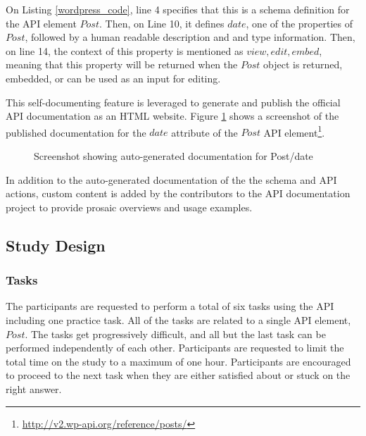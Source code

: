 \documentclass[conference]{IEEEtran}
\begin{document}
On Listing \ref{wordpress_code}, line 4 specifies that this is a schema definition for the API element $Post$. Then, on Line 10, it defines $date$, one of the properties of $Post$, followed by a human readable description and and type information. Then, on line 14, the context of this property is mentioned as $view, edit, embed$, meaning that this property will be returned when the $Post$ object is returned, embedded, or can be used as an input for editing.

This self-documenting feature is leveraged to generate and publish the official API documentation as an HTML website. Figure \ref{fig:schema} shows a screenshot of the published documentation for the $date$ attribute of the $Post$ API element\footnote{\url{http://v2.wp-api.org/reference/posts/}}.

\begin{figure}[h!]
\begin{center}
\end{center}
\caption{Screenshot showing auto-generated documentation for Post/date}
\label{fig:schema}
\end{figure}

In addition to the auto-generated documentation of the the schema and API actions, custom content is added by the contributors to the API documentation project to provide prosaic overviews and usage examples.



\subsection{Study Design} %
\subsubsection{Tasks} %

The participants are requested to perform a total of six tasks using the API including one practice task. All of the tasks are related to a single API element, $Post$. The tasks get progressively difficult, and all but the last task can be performed independently of each other. Participants are requested to limit the total time on the study to a maximum of one hour. Participants are encouraged to proceed to the next task when they are either satisfied about or stuck on the right answer.
\end{document}

